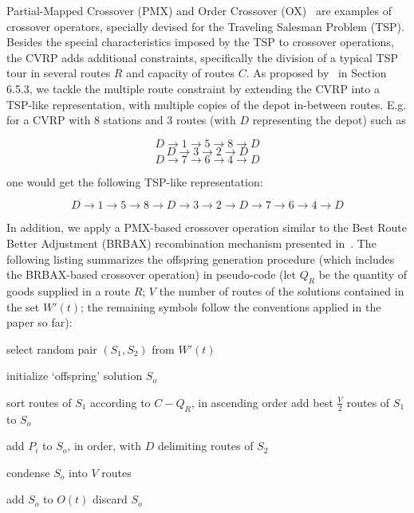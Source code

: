 Partial-Mapped Crossover (PMX) and Order Crossover (OX)~\cite{Toth2002} are 
examples of crossover operators, specially devised for the Traveling Salesman 
Problem (TSP). Besides the special characteristics imposed by the TSP to 
crossover operations, the CVRP adds 
additional constraints, specifically the division of a 
typical TSP tour in several routes $R$ and capacity of routes $C$. As proposed 
by~\cite{Toth2002} in Section 6.5.3, we tackle the multiple route constraint by 
extending the CVRP into a TSP-like representation, with multiple copies of the 
depot in-between routes. E.g. for a CVRP with 8 stations and 3 routes (with 
$D$ representing the depot) such as

\[ D \rightarrow 1 \rightarrow 5 \rightarrow 8 \rightarrow D \] 
\[ D \rightarrow 3 \rightarrow 2 \rightarrow D \] 
\[ D \rightarrow 7 \rightarrow 6 \rightarrow 4 \rightarrow D \] 

one would get the following TSP-like representation:

\[ D \rightarrow 1 \rightarrow 5 \rightarrow 8 \rightarrow D \rightarrow 3 \rightarrow 2 \rightarrow D \rightarrow 7 \rightarrow 6 \rightarrow 4 \rightarrow D \] 

In addition, we apply a PMX-based crossover operation similar to the Best 
Route Better Adjustment (BRBAX) recombination mechanism presented 
in~\cite{Bermudez2010}. The following listing summarizes the offspring 
generation procedure (which includes the BRBAX-based crossover operation) in 
pseudo-code (let $Q_R$ be the quantity of goods supplied in a route $R$; $V$ the number of 
routes of the solutions contained in the set $W'(t)$; the remaining symbols 
follow the conventions applied in the paper so far):\vertbreak

\begin{algorithmic}[1]


    \Repeat
        \State select random pair $(S_1,S_2)$ from $W'(t)$

    \State initialize `offspring' solution $S_o$

    \State sort routes of $S_1$ according to $C - Q_R$, 
    \Statex[2] in ascending order
    \State add best $\frac{V}{2}$ routes of $S_1$ to $S_o$

                \State add $P_i$ to $S_o$, in order, 
                \Statex[5] with $D$ delimiting routes of $S_2$
            \EndIf
        \EndFor
    \EndFor

        \State condense $S_o$ into $V$ routes
    \EndIf

        \State add $S_o$ to $O(t)$
    \Else
        \State discard $S_o$
    \EndIf

\EndWhile

\end{algorithmic}\vertbreak

